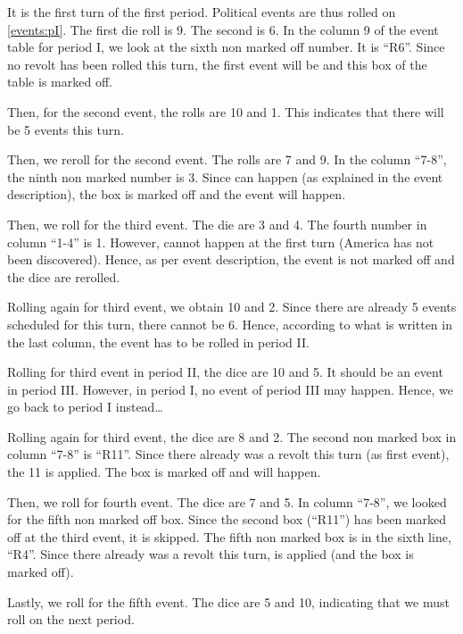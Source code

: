 \begin{exemple}
  It is the first turn of the first period. Political events are thus
  rolled on \ref{events:pI}. The first die roll is 9. The second is
  6. In the column 9 of the event table for period I, we look at the
  sixth non marked off number. It is ``R6''. Since no revolt has been
  rolled this turn, the first event will be \RD and this box of the
  table is marked off.

  Then, for the second event, the rolls are 10 and 1. This indicates
  that there will be 5 events this turn.

  Then, we reroll for the second event. The rolls are 7 and 9. In the
  column ``7-8'', the ninth non marked number is 3. Since  can happen (as explained in the event description),
  the box is marked off and the event will happen.

  Then, we roll for the third event. The die are 3 and 4. The fourth
  number in column ``1-4'' is 1. However,  cannot
  happen at the first turn (America has not been discovered). Hence, as
  per event description, the event is not marked off and the dice are
  rerolled.

  Rolling again for third event, we obtain 10 and 2. Since there are
  already 5 events scheduled for this turn, there cannot be 6. Hence,
  according to what is written in the last column, the event has to be
  rolled in period II.

  Rolling for third event in period II, the dice are 10 and 5. It should
  be an event in period III. However, in period I, no event of period
  III may happen. Hence, we go back to period I instead\ldots

  Rolling again for third event, the dice are 8 and 2. The second non
  marked box in column ``7-8'' is ``R11''. Since there already was a
  revolt this turn (as first event), the 11 is applied. The box is
  marked off and  will happen.

  Then, we roll for fourth event. The dice are 7 and 5. In column
  ``7-8'', we looked for the fifth non marked off box. Since the second
  box (``R11'') has been marked off at the third event, it is
  skipped. The fifth non marked box is in the sixth line, ``R4''. Since
  there already was a revolt this turn,  is
  applied (and the box is marked off).

  Lastly, we roll for the fifth event. The dice are 5 and 10, indicating
  that we must roll on the next period.


\end{exemple}
